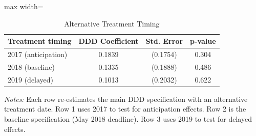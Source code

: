 \begin{table}[H]
\centering
\caption{Alternative Treatment Timing}
\label{tab:timing}

\begin{adjustbox}{max width=\textwidth}\begin{tabular}{lccc}
\toprule
Treatment timing & DDD Coefficient & Std. Error & p-value \\
\midrule
2017 (anticipation) & 0.1839 & (0.1754) & 0.304 \\
2018 (baseline) & 0.1335 & (0.1888) & 0.486 \\
2019 (delayed) & 0.1013 & (0.2032) & 0.622 \\
\bottomrule
\end{tabular}\end{adjustbox}
\par\vspace{0.3em}

\textit{Notes:} Each row re-estimates the main DDD specification with an alternative treatment date. Row 1 uses 2017 to test for anticipation effects. Row 2 is the baseline specification (May 2018 deadline). Row 3 uses 2019 to test for delayed effects.


\end{table}
